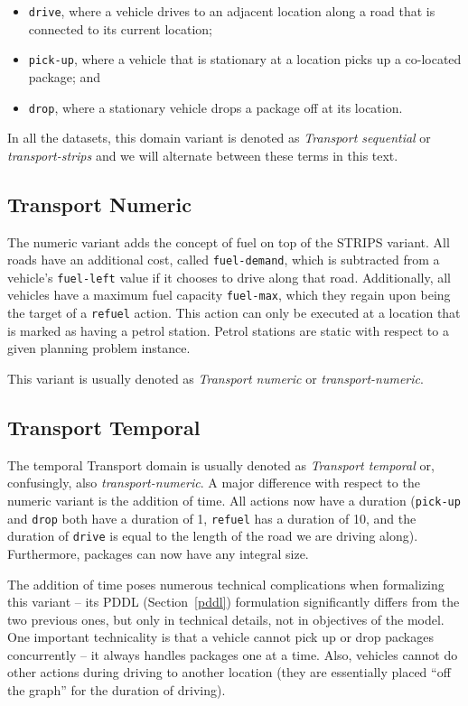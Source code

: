 \begin{itemize}
\item \verb+drive+, where a vehicle drives to an adjacent location
along a road that is connected to its current location;
\item \verb+pick-up+, where a vehicle that is stationary at a location picks up a co-located package; and
\item \verb+drop+, where a stationary vehicle drops a package off at its location.
\end{itemize}

In all the datasets, this domain variant is denoted as \textit{Transport sequential}
or \textit{transport-strips} and we will alternate between these terms in this text.

\subsection{Transport Numeric}\label{transport-numeric}

The numeric variant adds the concept of fuel on top of the STRIPS variant.
All roads have an additional cost, called \verb+fuel-demand+, which is
subtracted from a vehicle's \verb+fuel-left+ value if it chooses to drive along that road.
Additionally, all vehicles have a maximum fuel capacity \verb+fuel-max+,
which they regain upon being the target of a \verb+refuel+ action. This action can only
be executed at a location that is marked as having a petrol station. Petrol stations
are static with respect to a given planning problem instance.

This variant is usually denoted as \textit{Transport numeric} or \textit{transport-numeric}.

\subsection{Transport Temporal}\label{transport-temporal}

The temporal Transport domain is usually denoted as \textit{Transport temporal} or, confusingly,
also \textit{transport-numeric}. A major difference with respect to the numeric variant is
the addition of time. All actions now have a duration (\verb+pick-up+ and \verb+drop+ both have a
duration of 1, \verb+refuel+ has a duration of 10, and the duration of \verb+drive+ is
equal to the length of the road we are driving along). Furthermore, packages can now have any integral size.

The addition of time poses numerous technical complications when formalizing this variant
-- its PDDL (Section~\ref{pddl}) formulation significantly differs from the two previous ones, but only in technical details, not in objectives of the model.
One important technicality is that a vehicle cannot pick up or drop packages concurrently -- it always handles packages one at a time. Also, vehicles cannot do other actions during driving to another location (they are essentially placed ``off the graph'' for the duration of driving).

